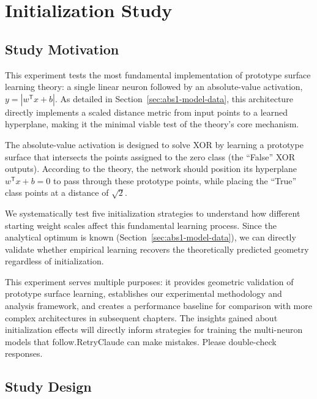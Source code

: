 ﻿%

\section{Initialization Study}
\label{sec:abs1-init}


\subsection*{Study Motivation}

This experiment tests the most fundamental implementation of prototype surface learning theory: a single linear neuron followed by an absolute-value activation, $y = |w^{\mathsf{T}}x + b|$. As detailed in Section~\ref{sec:abs1-model-data}, this architecture directly implements a scaled distance metric from input points to a learned hyperplane, making it the minimal viable test of the theory's core mechanism.

The absolute-value activation is designed to solve XOR by learning a prototype surface that intersects the points assigned to the zero class (the ``False'' XOR outputs). According to the theory, the network should position its hyperplane $w^{\mathsf{T}}x + b = 0$ to pass through these prototype points, while placing the ``True'' class points at a distance of $\sqrt{2}$.

We systematically test five initialization strategies to understand how different starting weight scales affect this fundamental learning process. Since the analytical optimum is known (Section~\ref{sec:abs1-model-data}), we can directly validate whether empirical learning recovers the theoretically predicted geometry regardless of initialization.

This experiment serves multiple purposes: it provides geometric validation of prototype surface learning, establishes our experimental methodology and analysis framework, and creates a performance baseline for comparison with more complex architectures in subsequent chapters. The insights gained about initialization effects will directly inform strategies for training the multi-neuron models that follow.RetryClaude can make mistakes. Please double-check responses.


\subsection*{Study Design}

